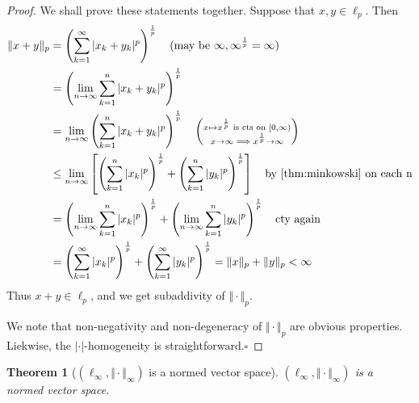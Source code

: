 \documentclass[11pt, oneside]{book}
\theoremstyle{break}
\newtheorem{thm}{Theorem}[section]
\newtheorem*{proof}{Proof}
\newcommand{\qed}{\hfill\ensuremath{\square}}	%
\begin{document}
\begin{proof}
	We shall prove these statements together. Suppose that $x, y \in \ell_p$. Then
	\begin{align*}
		\Vert x + y\Vert _p &= \left( \sum_{k=1}^{\infty} |x_k + y_k|^p \right)^{\frac{1}{p}} \quad \text{(may be $\infty, \infty^{\frac{1}{p}} = \infty$)} \\
				&= \left( \lim_{n \to \infty} \sum_{k=1}^{n} |x_k + y_k|^p \right)^{\frac{1}{p}} \\
				&= \lim_{n \to \infty} \left( \sum_{k=1}^{n} |x_k + y_k|^p \right)^{\frac{1}{p}} \quad \left(\substack{x \mapsto x^{\frac{1}{p}} \text{ is cts on } [0, \infty) \\ x \to \infty \implies x^{\frac{1}{p}} \to \infty} \right) \\
				&\leq \lim_{n \to \infty} \left[ \left( \sum_{k=1}^{n} |x_k|^p \right)^{\frac{1}{p}} + \left( \sum_{k=1}^{n} |y_k|^p \right)^{\frac{1}{p}} \right] \quad \text{by \autoref{thm:minkowski} on each n} \\
				&= \left( \lim_{n \to \infty} \sum_{k=1}^{n} |x_k|^p \right)^{\frac{1}{p}} + \left( \lim_{n \to \infty} \sum_{k=1}^{n} |y_k|^p \right)^{\frac{1}{p}} \quad \text{cty again} \\
				&= \left( \sum_{k=1}^{\infty} |x_k|^p \right)^{\frac{1}{p}} + \left( \sum_{k=1}^{\infty} |y_k|^p \right)^{\frac{1}{p}} = \Vert x\Vert _p + \Vert y\Vert _p < \infty
	\end{align*}
	 Thus $x + y \in \ell_p$, and we get subaddivity of $\Vert \cdot\Vert _p$.

	 We note that non-negativity and non-degeneracy of $\Vert \cdot\Vert _p$ are obvious properties. Liekwise, the $|\cdot|$-homogeneity is straightforward.\qed
\end{proof}

\begin{thm}[$(\ell_\infty, \Vert \cdot\Vert _\infty)$ is a normed vector space]
	$(\ell_\infty, \Vert \cdot\Vert _\infty)$ is a normed vector space.
\end{thm}
\end{document}
